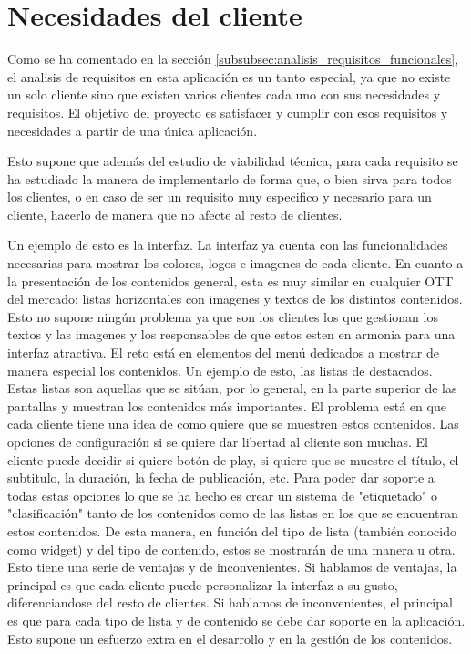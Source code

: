 \section{Necesidades del cliente}
\label{sec:analisis_necesidades_cliente}

Como se ha comentado en la sección \ref{subsubsec:analisis_requisitos_funcionales}, el analisis de requisitos
en esta aplicación es un tanto especial, ya que no existe un solo cliente sino que existen varios clientes
cada uno con sus necesidades y requisitos. El objetivo del proyecto es satisfacer y cumplir con esos 
requisitos y necesidades a partir de una única aplicación. 

Esto supone que además del estudio de viabilidad técnica, para cada requisito se ha estudiado la manera
de implementarlo de forma que, o bien sirva para todos los clientes, o en caso de ser un requisito 
muy especifico y necesario para un cliente, hacerlo de manera que no afecte al resto de clientes.

Un ejemplo de esto es la interfaz. La interfaz ya cuenta con las funcionalidades necesarias para mostrar
los colores, logos e imagenes de cada cliente. En cuanto a la presentación de los contenidos general, esta es muy similar
en cualquier OTT del mercado: listas horizontales con imagenes y textos de los distintos contenidos. Esto 
no supone ningún problema ya que son los clientes los que gestionan los textos y las imagenes y los responsables
de que estos esten en armonia para una interfaz atractiva. El reto está en elementos del menú dedicados a mostrar
de manera especial los contenidos. Un ejemplo de esto, las listas de destacados. Estas listas son aquellas que se sitúan,
por lo general, en la parte superior de las pantallas y muestran los contenidos más importantes. El problema está en que
cada cliente tiene una idea de como quiere que se muestren estos contenidos. Las opciones de configuración si se quiere
dar libertad al cliente son muchas. El cliente puede decidir si quiere botón de play, si quiere que se muestre el título,
el subtitulo, la duración, la fecha de publicación, etc. Para poder dar soporte a todas estas opciones lo que se ha hecho
es crear un sistema de "etiquetado" o "clasificación" tanto de los contenidos como de las listas en los que se encuentran
estos contenidos. De esta manera, en función del tipo de lista (también conocido como widget) y del tipo de contenido,
estos se mostrarán de una manera u otra. Esto tiene una serie de ventajas y de inconvenientes. Si hablamos de ventajas,
la principal es que cada cliente puede personalizar la interfaz a su gusto, diferenciandose del resto de clientes.
Si hablamos de inconvenientes, el principal es que para cada tipo de lista y de contenido se debe dar soporte en la aplicación.
 Esto supone un esfuerzo extra en el desarrollo y en la gestión de los contenidos. 

